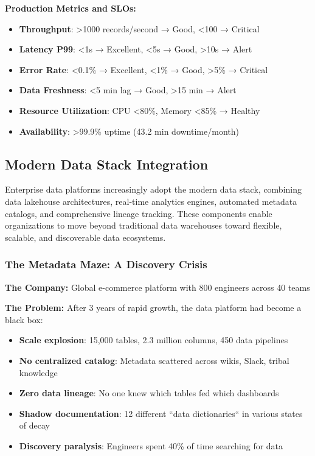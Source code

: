 \textbf{Production Metrics and SLOs:}

\begin{itemize}
    \item \textbf{Throughput}: >1000 records/second → Good, <100 → Critical
    \item \textbf{Latency P99}: <1s → Excellent, <5s → Good, >10s → Alert
    \item \textbf{Error Rate}: <0.1\% → Excellent, <1\% → Good, >5\% → Critical
    \item \textbf{Data Freshness}: <5 min lag → Good, >15 min → Alert
    \item \textbf{Resource Utilization}: CPU <80\%, Memory <85\% → Healthy
    \item \textbf{Availability}: >99.9\% uptime (43.2 min downtime/month)
\end{itemize}

\subsection{Modern Data Stack Integration}

Enterprise data platforms increasingly adopt the modern data stack, combining data lakehouse architectures, real-time analytics engines, automated metadata catalogs, and comprehensive lineage tracking. These components enable organizations to move beyond traditional data warehouses toward flexible, scalable, and discoverable data ecosystems.

\subsubsection{The Metadata Maze: A Discovery Crisis}

\textbf{The Company:} Global e-commerce platform with 800 engineers across 40 teams

\textbf{The Problem:} After 3 years of rapid growth, the data platform had become a black box:

\begin{itemize}
    \item \textbf{Scale explosion}: 15,000 tables, 2.3 million columns, 450 data pipelines
    \item \textbf{No centralized catalog}: Metadata scattered across wikis, Slack, tribal knowledge
    \item \textbf{Zero data lineage}: No one knew which tables fed which dashboards
    \item \textbf{Shadow documentation}: 12 different ``data dictionaries`` in various states of decay
    \item \textbf{Discovery paralysis}: Engineers spent 40\% of time searching for data
\end{itemize}

